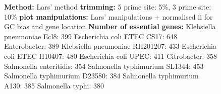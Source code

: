 \documentclass[a4paper,10pt]{article}
\begin{document}
\begin{figure}
{\textbf{Method:} Lars' method \newline
\textbf{trimming:} 5 prime site: 5\%, 3 prime site: 10\%\newline
\textbf{plot manipulations:} Lars' manipulations + normalised ii for GC bias and gene location\newline
\textbf{Number of essential genes:}\newline
Klebsiella pneumoniae Ecl8: 399 \newline
Escherichia coli ETEC CS17: 648 \newline
Enterobacter: 389 \newline
Klebsiella pneumoniae RH201207: 433 \newline
Escherichia coli ETEC H10407: 480 \newline
Escherichia coli UPEC: 411 \newline
Citrobacter: 358 \newline
Salmonella enteritidis: 354 \newline
Salmonella typhimurium SL1344: 453 \newline
Salmonella typhimurium D23580: 384 \newline
Salmonella typhimurium A130: 385 \newline
Salmonella typhi: 380}
\end{figure}
\end{document}
